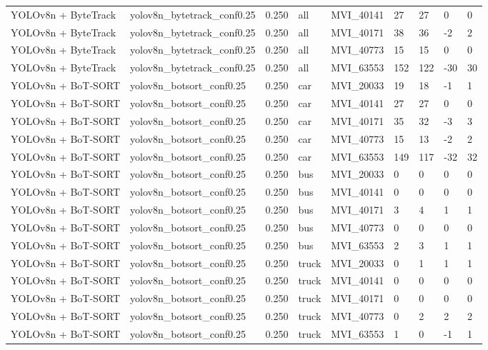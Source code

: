 \begin{tabular}{lllllllll}
YOLOv8n + ByteTrack & yolov8n\_bytetrack\_conf0.25 & 0.250 & all & MVI\_40141 & 27 & 27 & 0 & 0 \\
YOLOv8n + ByteTrack & yolov8n\_bytetrack\_conf0.25 & 0.250 & all & MVI\_40171 & 38 & 36 & -2 & 2 \\
YOLOv8n + ByteTrack & yolov8n\_bytetrack\_conf0.25 & 0.250 & all & MVI\_40773 & 15 & 15 & 0 & 0 \\
YOLOv8n + ByteTrack & yolov8n\_bytetrack\_conf0.25 & 0.250 & all & MVI\_63553 & 152 & 122 & -30 & 30 \\
YOLOv8n + BoT-SORT & yolov8n\_botsort\_conf0.25 & 0.250 & car & MVI\_20033 & 19 & 18 & -1 & 1 \\
YOLOv8n + BoT-SORT & yolov8n\_botsort\_conf0.25 & 0.250 & car & MVI\_40141 & 27 & 27 & 0 & 0 \\
YOLOv8n + BoT-SORT & yolov8n\_botsort\_conf0.25 & 0.250 & car & MVI\_40171 & 35 & 32 & -3 & 3 \\
YOLOv8n + BoT-SORT & yolov8n\_botsort\_conf0.25 & 0.250 & car & MVI\_40773 & 15 & 13 & -2 & 2 \\
YOLOv8n + BoT-SORT & yolov8n\_botsort\_conf0.25 & 0.250 & car & MVI\_63553 & 149 & 117 & -32 & 32 \\
YOLOv8n + BoT-SORT & yolov8n\_botsort\_conf0.25 & 0.250 & bus & MVI\_20033 & 0 & 0 & 0 & 0 \\
YOLOv8n + BoT-SORT & yolov8n\_botsort\_conf0.25 & 0.250 & bus & MVI\_40141 & 0 & 0 & 0 & 0 \\
YOLOv8n + BoT-SORT & yolov8n\_botsort\_conf0.25 & 0.250 & bus & MVI\_40171 & 3 & 4 & 1 & 1 \\
YOLOv8n + BoT-SORT & yolov8n\_botsort\_conf0.25 & 0.250 & bus & MVI\_40773 & 0 & 0 & 0 & 0 \\
YOLOv8n + BoT-SORT & yolov8n\_botsort\_conf0.25 & 0.250 & bus & MVI\_63553 & 2 & 3 & 1 & 1 \\
YOLOv8n + BoT-SORT & yolov8n\_botsort\_conf0.25 & 0.250 & truck & MVI\_20033 & 0 & 1 & 1 & 1 \\
YOLOv8n + BoT-SORT & yolov8n\_botsort\_conf0.25 & 0.250 & truck & MVI\_40141 & 0 & 0 & 0 & 0 \\
YOLOv8n + BoT-SORT & yolov8n\_botsort\_conf0.25 & 0.250 & truck & MVI\_40171 & 0 & 0 & 0 & 0 \\
YOLOv8n + BoT-SORT & yolov8n\_botsort\_conf0.25 & 0.250 & truck & MVI\_40773 & 0 & 2 & 2 & 2 \\
YOLOv8n + BoT-SORT & yolov8n\_botsort\_conf0.25 & 0.250 & truck & MVI\_63553 & 1 & 0 & -1 & 1 \\

\end{tabular}
